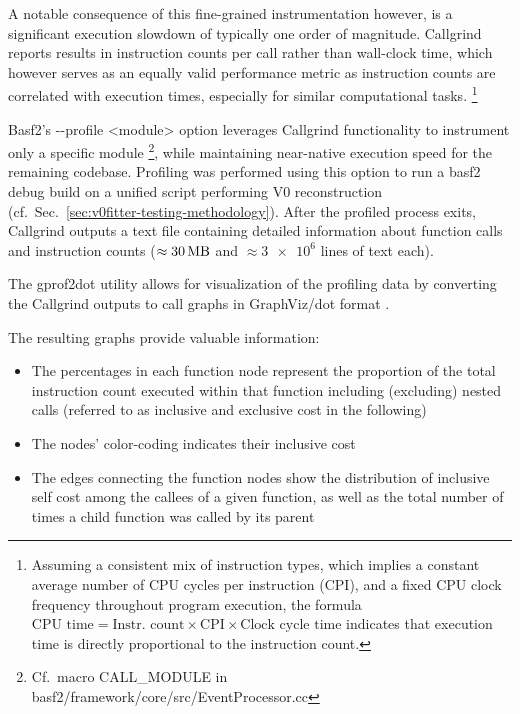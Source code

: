 A notable consequence of this fine-grained instrumentation however, is a significant execution slowdown of typically one order of magnitude.
Callgrind reports results in instruction counts per call rather than wall-clock time, which however serves as an equally valid performance metric as instruction counts are correlated with execution times, especially for similar computational tasks.%
\footnote{%
  Assuming a consistent mix of instruction types, which implies a constant average number of CPU cycles per instruction (CPI), and a fixed CPU clock frequency throughout program execution, the formula $\text{CPU time} = \text{Instr.\ count} \times \text{CPI} \times \text{Clock cycle time}$ \cite{computer-architecture} indicates that execution time is directly proportional to the instruction count.
}

Basf2's {-}{-}profile <module> option leverages Callgrind functionality to instrument only a specific module%
\footnote{Cf.\ macro CALL\_MODULE in basf2/framework/core/src/EventProcessor.cc},
while maintaining near-native execution speed for the remaining codebase.
Profiling was performed using this option to run a basf2 debug build on a unified script performing V0 reconstruction (cf.\ Sec.\ \ref{sec:v0fitter-testing-methodology}).
After the profiled process exits, Callgrind outputs a text file containing detailed information about function calls and instruction counts ($\approx\qty{30}{\mega\byte}$ and $\approx \num{3e6}$ lines of text each).

The gprof2dot \cite{gprof2dot} utility allows for visualization of the profiling data by converting the Callgrind outputs to call graphs in GraphViz/dot format \cite{graphviz}.
\begin{samepage}

  The resulting graphs provide valuable information:
  \begin{itemize}[topsep=0pt]
    \item The percentages in each function node represent the proportion of the total instruction count executed within that function including (excluding) nested calls (referred to as inclusive and exclusive cost in the following)
    \item The nodes' color-coding indicates their inclusive cost
    \item The edges connecting the function nodes show the distribution of inclusive self cost among the callees of a given function, as well as the total number of times a child function was called by its parent
  \end{itemize}
\end{samepage}



